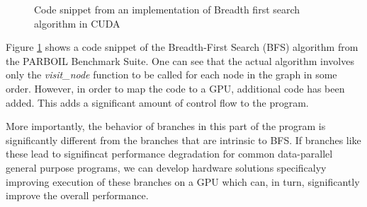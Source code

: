 
\begin{figure}
	
	\caption{Code snippet from an implementation of Breadth first search algorithm in CUDA \label{fig:bfs-kernel}}
\end{figure}

\par{Figure \ref{fig:bfs-kernel} shows a code snippet of the Breadth-First Search (BFS) algorithm from the PARBOIL Benchmark Suite. One can see that the actual algorithm involves only the \textit{visit\_node} function to be called for each node in the graph in some order. However, in order to map the code to a GPU, additional code has been added. This adds a significant amount of control flow to the program.}

\par{More importantly, the behavior of branches in this part of the program is significantly different from the branches that are intrinsic to BFS. If branches like these lead to signifincat performance degradation for common data-parallel general purpose programs, we can develop hardware solutions specificalyy improving execution of these branches on a GPU which can, in turn, significantly improve the overall performance.}
